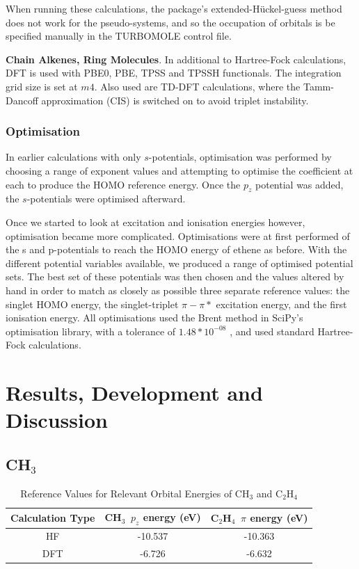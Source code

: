 \documentclass[journal=jctcce,manuscript=article]{achemso}
\begin{document}
When running these calculations, the package's extended-H\"uckel-guess method does not work for the pseudo-systems, and so the occupation of orbitals is be specified manually in the TURBOMOLE control file.

\textbf{Chain Alkenes, Ring Molecules}. In additional to Hartree-Fock calculations, DFT is used with PBE0, PBE, TPSS and TPSSH functionals. \cite{pbe0}\cite{pbe}\cite{tpss}\cite{tpssh} The integration grid size is set at \(m4\). Also used are TD-DFT calculations, where the Tamm-Dancoff approximation (CIS) \cite{tammdancoff} is switched on to avoid triplet instability.

\subsubsection{Optimisation}

In earlier calculations with only \(s\)-potentials, optimisation was performed by choosing a range of exponent values and attempting to optimise the coefficient at each to produce the HOMO reference energy. Once the \(p_{z}\) potential was added, the \(s\)-potentials were optimised afterward. 

Once we started to look at excitation and ionisation energies however, optimisation became more complicated. Optimisations were at first performed of the s and p-potentials to reach the HOMO energy of ethene as before. With the different potential variables available, we produced a range of optimised potential sets. The best set of these potentials was then chosen and the values altered by hand in order to match as closely as possible three separate reference values: the singlet HOMO energy, the singlet-triplet \(\pi-\pi*\) excitation energy, and the first ionisation energy. All optimisations used the Brent method in SciPy's optimisation library, with a tolerance of \(1.48*10^{-08}\) \cite{scipy}, and used standard Hartree-Fock calculations.

\section{Results, Development and Discussion}
\subsection{CH\(_{3}\)}

\begin{table}[ht]
\caption{Reference Values for Relevant Orbital Energies of CH\(_{3}\) and C\(_{2}\)H\(_{4}\)} 
\centering
\begin{tabular}{c c c}
\hline\hline
Calculation Type & CH\(_{3}\)\, \(p_{z}\) energy (eV) & C\(_{2}\)H\(_{4}\)\, \(\pi\) energy (eV) \\
\hline
HF & -10.537 & -10.363 \\
DFT & -6.726 & -6.632 \\
\hline
\end{tabular}
\label{table:ref_values_1}
\end{table}
\end{document}
